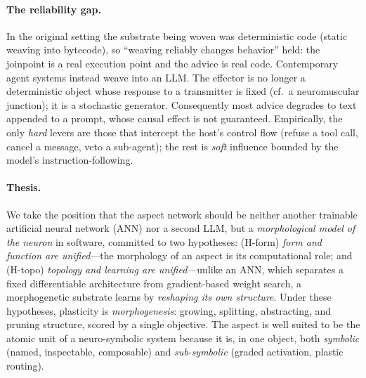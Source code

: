 \documentclass[11pt]{article}
\theoremstyle{definition}
\begin{document}
\paragraph{The reliability gap.}
In the original setting the substrate being woven was deterministic code
(static weaving into bytecode), so ``weaving reliably changes behavior''
held: the joinpoint is a real execution point and the advice is real code.
Contemporary agent systems instead weave into an LLM. The effector is no
longer a deterministic object whose response to a transmitter is fixed
(cf.\ a neuromuscular junction); it is a stochastic generator. Consequently
most advice degrades to text appended to a prompt, whose causal effect is
not guaranteed. Empirically, the only \emph{hard} levers are those that
intercept the host's control flow (refuse a tool call, cancel a message,
veto a sub-agent); the rest is \emph{soft} influence bounded by the model's
instruction-following.

\paragraph{Thesis.}
We take the position that the aspect network should be neither another
trainable artificial neural network (ANN) nor a second LLM, but a
\emph{morphological model of the neuron} in software, committed to two
hypotheses: (H-form) \emph{form and function are unified}---the morphology
of an aspect is its computational role; and (H-topo) \emph{topology and
learning are unified}---unlike an ANN, which separates a fixed differentiable
architecture from gradient-based weight search, a morphogenetic substrate
learns by \emph{reshaping its own structure}. Under these hypotheses,
plasticity is \emph{morphogenesis}: growing, splitting, abstracting, and
pruning structure, scored by a single objective. The aspect is well suited
to be the atomic unit of a neuro-symbolic system because it is, in one
object, both \emph{symbolic} (named, inspectable, composable) and
\emph{sub-symbolic} (graded activation, plastic routing).
\end{document}

